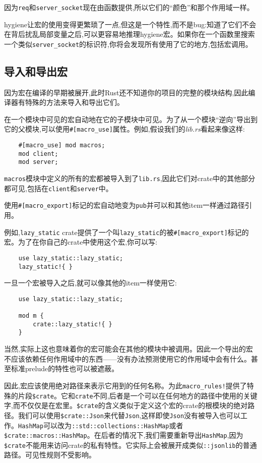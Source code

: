 因为\texttt{req}和\texttt{server\_socket}现在由函数提供,所以它们的“颜色”和那个作用域一样。

hygiene让宏的使用变得更繁琐了一点,但这是一个特性,而不是bug:知道了它们不会在背后扰乱局部变量之后,可以更容易地推理hygiene宏。如果你在一个函数里搜索一个类似\texttt{server\_socket}的标识符,你将会发现所有使用了它的地方,包括宏调用。

\subsection{导入和导出宏}
因为宏在编译的早期被展开,此时Rust还不知道你的项目的完整的模块结构,因此编译器有特殊的方法来导入和导出它们。

在一个模块中可见的宏自动地在它的子模块中可见。为了从一个模块“逆向”导出到它的父模块,可以使用\texttt{\#[macro\_use]}属性。例如,假设我们的\emph{lib.rs}看起来像这样:
\begin{verbatim}
    #[macro_use] mod macros;
    mod client;
    mod server;
\end{verbatim}

\texttt{macros}模块中定义的所有的宏都被导入到了\texttt{lib.rs},因此它们对crate中的其他部分都可见,包括在\texttt{client}和\texttt{server}中。

使用\texttt{\#[macro\_export]}标记的宏自动地变为\texttt{pub}并可以和其他item一样通过路径引用。

例如,\texttt{lazy\_static} crate提供了一个叫\texttt{lazy\_static}的被\texttt{\#[macro\_export]}标记的宏。为了在你自己的crate中使用这个宏,你可以写:
\begin{verbatim}
    use lazy_static::lazy_static;
    lazy_static!{ }
\end{verbatim}
一旦一个宏被导入之后,就可以像其他的item一样使用它:
\begin{verbatim}
    use lazy_static::lazy_static;

    mod m {
        crate::lazy_static!{ }
    }
\end{verbatim}

当然,实际上这也意味着你的宏可能会在其他的模块中被调用。因此一个导出的宏不应该依赖任何作用域中的东西——没有办法预测使用它的作用域中会有什么。甚至标准prelude的特性也可以被遮蔽。

因此,宏应该使用绝对路径来表示它用到的任何名称。为此\texttt{macro\_rules!}提供了特殊的片段\texttt{\$crate}。它和\texttt{crate}不同,后者是一个可以在任何地方的路径中使用的关键字,而不仅仅是在宏里。\texttt{\$crate}的含义类似于定义这个宏的crate的根模块的绝对路径。我们可以使用\texttt{\$crate::Json}来代替\texttt{Json},这样即使\texttt{Json}没有被导入也可以工作。\texttt{HashMap}可以改为\texttt{::std::collections::HashMap}或者\texttt{\$crate::macros::HashMap}。在后者的情况下,我们需要重新导出\texttt{HashMap},因为\texttt{\$crate}不能用来访问crate的私有特性。它实际上会被展开成类似\texttt{::jsonlib}的普通路径。可见性规则不受影响。

